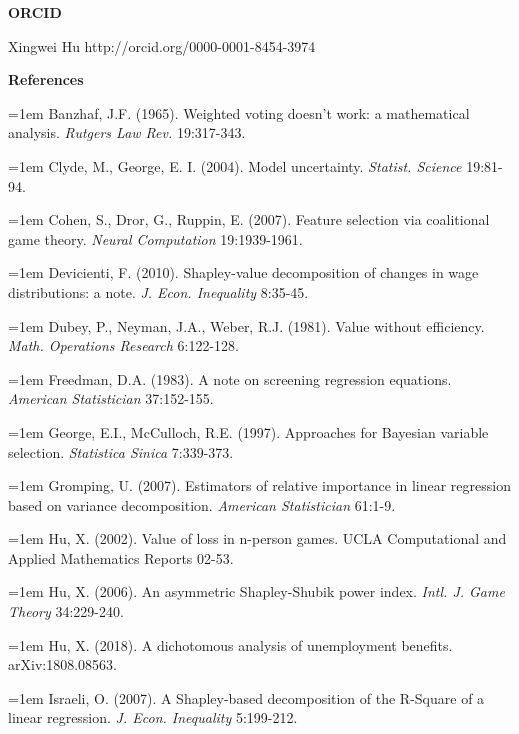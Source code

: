 \documentclass[a4paper,12pt]{article}
\begin{document}
\vskip 1cm
\noindent \textbf{ORCID}

\noindent Xingwei Hu http://orcid.org/0000-0001-8454-3974

\vskip 1cm
\noindent \textbf{References}

\hangindent=1em
\noindent  Banzhaf, J.F. (1965).
Weighted voting doesn't work: a mathematical analysis.
\textit{Rutgers Law Rev.} 19:317-343.

\hangindent=1em
\noindent  Clyde, M.,  George, E. I.  (2004).
Model uncertainty.
\textit{Statist. Science} 19:81-94.

\hangindent=1em
\noindent  Cohen, S.,  Dror, G.,   Ruppin, E. (2007).
Feature selection via coalitional game theory.
\textit{Neural Computation} 19:1939-1961.

\hangindent=1em
\noindent  Devicienti, F. (2010).
Shapley-value decomposition of changes in wage distributions: a note.
\textit{J.  Econ. Inequality}  8:35-45.

\hangindent=1em
\noindent Dubey, P.,   Neyman, J.A.,  Weber, R.J. (1981).
Value  without efficiency.
\textit{Math. Operations Research}  6:122-128.

\hangindent=1em
\noindent  Freedman, D.A. (1983).
A note on screening regression equations.
\textit{American Statistician} 37:152-155.

\hangindent=1em
\noindent  George, E.I.,   McCulloch, R.E. (1997).
Approaches for Bayesian variable selection.
\textit{Statistica Sinica} 7:339-373.

\hangindent=1em
\noindent  Gromping, U. (2007).
Estimators of relative importance in linear regression based on variance decomposition.
\textit{American Statistician} 61:1-9.

\hangindent=1em
\noindent  Hu,  X. (2002).
Value of loss in n-person games.
UCLA Computational and Applied Mathematics Reports 02-53.

\hangindent=1em
\noindent  Hu, X. (2006).
An asymmetric Shapley-Shubik power index.
\textit{Intl.  J.  Game Theory} 34:229-240.

\hangindent=1em
\noindent  Hu, X. (2018).
A dichotomous analysis of unemployment benefits.
arXiv:1808.08563.

\hangindent=1em
\noindent  Israeli, O. (2007).
A Shapley-based decomposition of the R-Square of a linear regression.
\textit{J.  Econ. Inequality} 5:199-212.
\end{document}
